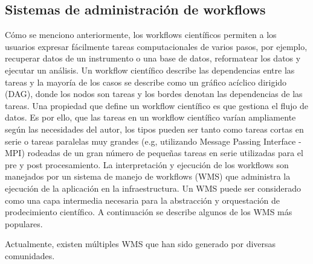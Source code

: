 


\subsection{Sistemas de administración de workflows}

Cómo se menciono anteriormente, los workflows científicos permiten a los usuarios expresar fácilmente tareas computacionales de varios pasos, por ejemplo, recuperar datos de un instrumento o una base de datos, reformatear los datos y ejecutar un análisis. 
Un workflow científico describe las dependencias entre las tareas y la mayoría de los casos se describe como un gráfico acíclico dirigido (DAG), donde los nodos son tareas y los bordes denotan las dependencias de las tareas.
Una propiedad que define un workflow científico es que gestiona el flujo de datos. Es por ello, que las tareas en un  workflow científico varían ampliamente según las necesidades del autor, los tipos pueden ser tanto como tareas cortas en serie o tareas paralelas muy grandes (e.g, utilizando Message Passing Interface - MPI) rodeadas de un gran número de pequeñas tareas en serie utilizadas para el pre y post procesamiento.
La interpretación y ejecución de los workflows son manejados por un sistema de manejo de workflows (WMS) que administra la ejecución de la aplicación en la infraestructura. 
Un WMS puede ser considerado como una capa intermedia necesaria para la abstracción y orquestación de prodecimiento científico. A continuación se describe algunos de los WMS más populares.

Actualmente, existen múltiples WMS que han sido generado por diversas comunidades.

